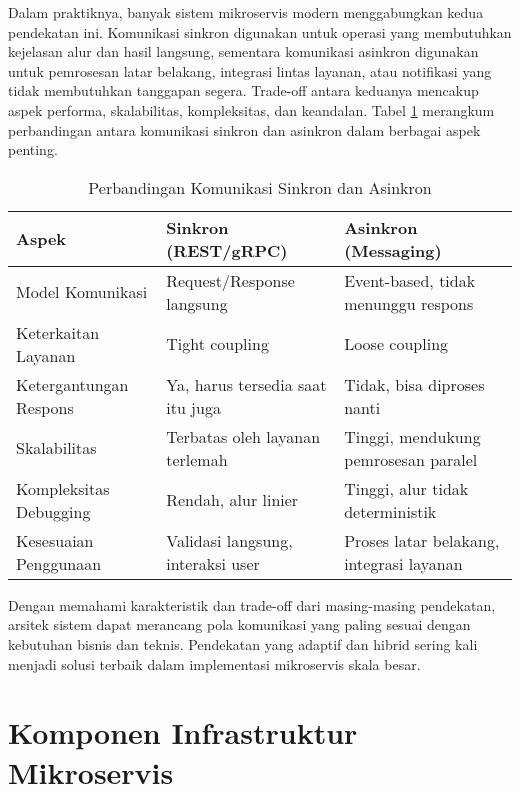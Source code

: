 Dalam praktiknya, banyak sistem mikroservis modern menggabungkan kedua pendekatan ini. Komunikasi sinkron digunakan untuk operasi yang membutuhkan kejelasan alur dan hasil langsung, sementara komunikasi asinkron digunakan untuk pemrosesan latar belakang, integrasi lintas layanan, atau notifikasi yang tidak membutuhkan tanggapan segera. Trade-off antara keduanya mencakup aspek performa, skalabilitas, kompleksitas, dan keandalan. Tabel \ref{tab:komunikasi-sinkron-vs-asinkron} merangkum perbandingan antara komunikasi sinkron dan asinkron dalam berbagai aspek penting.

\begin{table}[h]
	\centering
	\caption{Perbandingan Komunikasi Sinkron dan Asinkron}
	\label{tab:komunikasi-sinkron-vs-asinkron}
	\begin{tabular}{|p{}|p{}|p{}|}
		\hline
		\textbf{Aspek} & \textbf{Sinkron (REST/gRPC)} & \textbf{Asinkron (Messaging)} \\
		\hline
		Model Komunikasi & Request/Response langsung & Event-based, tidak menunggu respons \\
		\hline
		Keterkaitan Layanan & Tight coupling & Loose coupling \\
		\hline
		Ketergantungan Respons & Ya, harus tersedia saat itu juga & Tidak, bisa diproses nanti \\
		\hline
		Skalabilitas & Terbatas oleh layanan terlemah & Tinggi, mendukung pemrosesan paralel \\
		\hline
		Kompleksitas Debugging & Rendah, alur linier & Tinggi, alur tidak deterministik \\
		\hline
		Kesesuaian Penggunaan & Validasi langsung, interaksi user & Proses latar belakang, integrasi layanan \\
		\hline
	\end{tabular}
\end{table}

Dengan memahami karakteristik dan trade-off dari masing-masing pendekatan, arsitek sistem dapat merancang pola komunikasi yang paling sesuai dengan kebutuhan bisnis dan teknis. Pendekatan yang adaptif dan hibrid sering kali menjadi solusi terbaik dalam implementasi mikroservis skala besar.




\section{Komponen Infrastruktur Mikroservis}

